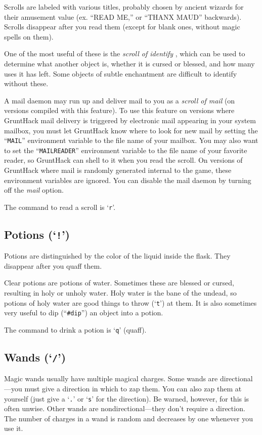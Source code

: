 Scrolls are labeled with various titles, probably chosen by ancient wizards
for their amusement value (ex. ``READ ME,'' or ``THANX MAUD'' backwards).
Scrolls disappear after you read them (except for blank ones, without
magic spells on them).

One of the most useful of these is the %
{\it  scroll of identify}%
, which
can be used to determine what another object is, whether it is cursed or
blessed, and how many uses it has left.  Some objects of subtle
enchantment are difficult to identify without these.

A mail daemon may run up and deliver mail to you as a
%
{\it scroll of mail}
(on versions compiled with this feature).
To use this feature on versions where GruntHack mail delivery is triggered
by electronic mail appearing in your system mailbox,
you must let GruntHack know where to look for new mail by setting
the ``{\tt MAIL}'' environment variable to the file name of your mailbox.
You may also want to set the ``{\tt MAILREADER}'' environment
variable to the file name of your favorite reader, so GruntHack can shell to it
when you read the scroll.
On versions of GruntHack where mail is randomly generated internal to the game,
these environment variables are ignored.
You can disable the mail daemon by turning off the
{\it mail }
option.

The command to read a scroll is `{\tt r}'.
\subsection*{Potions (`{\tt !}')}

Potions are distinguished by the color of the liquid inside the flask.
They disappear after you quaff them.

Clear potions are potions of water.  Sometimes these are blessed or cursed,
resulting in holy or unholy water.  Holy water is the bane of the undead, so
potions of holy water are good things to throw (`{\tt t}') at them.  It is also
sometimes very useful to dip (``{\tt \#dip}'') an object into a potion.

The command to drink a potion is `{\tt q}' (quaff).
\subsection*{Wands (`{\tt /}')}

Magic wands usually have multiple magical charges.  Some wands are
directional---you must give a direction in which to zap them.  You can also
zap them at yourself (just give a `{\tt .}' or `{\tt s}' for the direction).
Be warned,
however, for this is often unwise.  Other wands are nondirectional---they
don't require a direction.  The number of charges in a wand is random and
decreases by one whenever you use it.

